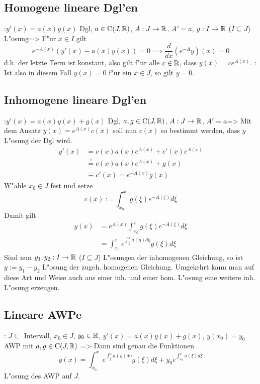 \subsection{Homogene lineare Dgl'en}
\lessertheorem:$y'(x)=a(x)y(x)$ Dgl, $a\in{\rm C}(J,\mathbb R)$, 
  $A:J\to\mathbb R$, $A'=a$, $y:I\to\mathbb R$ ($I\subseteq J$) L"osung=>{
  F"ur $x\in I$ gilt
  \[e^{-A(x)}(y'(x)-a(x)y(x))=0\implies \frac d {dx}(e^{-A}y)(x)=0
    \]
  d.h. der letzte Term ist konstant, also gilt f"ur alle $c\in\mathbb R$, dass
  $y(x)=ce^{A(x)}$.
  }
\remark:{
  Ist also in diesem Fall $y(x)=0$ f"ur ein $x\in J$, so gilt $y=0$.
  }
\subsection{Inhomogene lineare Dgl'en}
\lessertheorem:$y'(x)=a(x)y(x)+g(x)$ Dgl, $a,g\in{\rm C}(J,\mathbb R)$,
  $A:J\to\mathbb R$, $A'=a$=>{
  Mit dem Ansatz $y(x)=e^{A(x)}c(x)$ soll nun $c(x)$ so bestimmt werden, dass
  $y$ L"osung der Dgl wird.
  \begin{align*}
    y'(x)&=c(x)a(x)e^{A(x)}+c'(x)e^{A(x)} \\
         &\overset{!}{=}c(x)a(x)e^{A(x)}+g(x) \\
	 &\equiv c'(x)=e^{-A(x)}g(x)
    \end{align*}
  W"ahle $x_0\in J$ fest und setze
  \[c(x):=\int_{x_0}^x g(\xi)e^{-A(\xi)}d\xi
    \]
  Damit gilt
  \begin{align*}
    y(x)&=e^{A(x)}\int_{x_0}^x g(\xi) e^{-A(\xi)} d\xi \\
        &=\int_{x_0}^x e^{\int_\xi^x a(\eta)d\eta} g(\xi) d\xi
    \end{align*}
  Sind nun $y_1,y_2:I\to\mathbb R$ ($I\subseteq J$) L"osungen der inhomogenen
  Gleichung, so ist $y:=y_1-y_2$ L"osung der zugeh. homogenen Gleichung.
  Umgekehrt kann man auf diese Art und Weise auch aus einer inh. und einer 
  hom. L"osung eine weitere inh. L"osung erzeugen.
  }
\subsection{Lineare AWPe}
\theorem: $J\subseteq$ Intervall, $x_0\in J$, $y_0\in\mathbb R$, 
  $y'(x)=a(x)y(x)+g(x)$, $y(x_0)=y_0$ AWP mit $a,g\in{\rm C}(J,\mathbb R)$ =>{
  Dann sind genau die Funktionen
  \[y(x)=\int_{x_0}^x e^{\int_\xi^x a(\eta)d\eta} g(\xi) d\xi
    +y_0e^{\int_{x_0}^x a(\xi)d\xi}
    \]
  L"osung des AWP auf $J$.
  }
